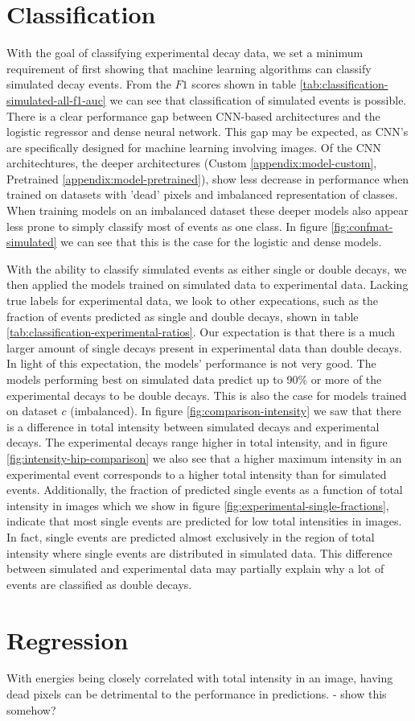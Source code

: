 \section{Classification}
With the goal of classifying experimental decay data, we set a minimum requirement
of first showing that machine learning algorithms can classify simulated decay events.
From the $F1$ scores shown in table \ref{tab:classification-simulated-all-f1-auc} we
can see that classification of simulated events is possible.
There is a clear performance gap between CNN-based architectures and the logistic regressor and dense
neural network. This gap may be expected, as CNN's are specifically designed for
machine learning involving images. Of the CNN architechtures, the deeper architectures
(Custom \ref{appendix:model-custom}, Pretrained \ref{appendix:model-pretrained}),
show less decrease in performance when trained on datasets with 'dead' pixels and
imbalanced representation of classes. When training models on an imbalanced dataset
these deeper models also appear less prone to simply classify most of events as one
class. In figure \ref{fig:confmat-simulated} we can see that this is the case for
the logistic and dense models.

With the ability to classify simulated events as either single or double decays,
we then applied the models trained on simulated data to experimental data.
Lacking true labels for experimental data, we look to other expecations, such
as the fraction of events predicted as single and double decays, shown in table
\ref{tab:classification-experimental-ratios}. Our expectation is that there is
a much larger amount of single decays present in experimental data than
double decays. In light of this expectation, the models' performance is not very good.
The models performing best on simulated data predict up to 90\% or more of the
experimental decays to be double decays. This is also the case for models trained
on dataset $c$ (imbalanced). In figure \ref{fig:comparison-intensity} we saw that
there is a difference in total intensity between simulated decays and experimental
decays. The experimental decays range higher in total intensity, and in figure
\ref{fig:intensity-hip-comparison} we also see that a higher maximum intensity in
an experimental event corresponds to a higher total intensity than for simulated
events. Additionally, the fraction of predicted single events as a function of total
intensity in images which we show in figure \ref{fig:experimental-single-fractions},
indicate that most single events are predicted for low total intensities in images.
In fact, single events are predicted almost exclusively in the region of total intensity
where single events are distributed in simulated data. This difference between simulated
and experimental data may partially explain why a lot of events are classified as double
decays.



\section{Regression}
With energies being closely correlated with total intensity in an image,
having dead pixels can be detrimental to the performance in predictions.
- show this somehow?